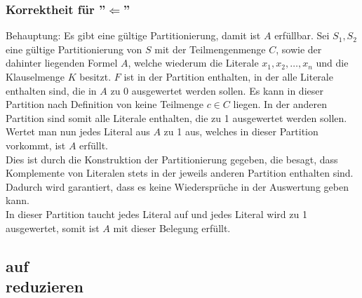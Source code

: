 \documentclass[a4paper]{article}
\begin{document}
			\subsubsection{Korrektheit für ''$\Leftarrow$''}
			Behauptung: Es gibt eine gültige Partitionierung, damit ist $A$ erfüllbar.\n
			Sei $S_1, S_2$ eine gültige Partitionierung von $S$ mit der Teilmengenmenge $C$, sowie der dahinter liegenden Formel $A$, welche wiederum die Literale $x_1, x_2, \dots, x_n$ und die Klauselmenge $K$ besitzt.
			$F$ ist in der Partition enthalten, in der alle Literale enthalten sind, die in $A$ zu 0 ausgewertet werden sollen. Es kann in dieser Partition nach Definition von \setsplit keine Teilmenge $c\in C$ liegen.
			In der anderen Partition sind somit alle Literale enthalten, die zu 1 ausgewertet werden sollen. Wertet man nun jedes Literal aus $A$ zu 1 aus, welches in dieser Partition vorkommt, ist $A$ erfüllt.\\
			Dies ist durch die Konstruktion der Partitionierung gegeben, die besagt, dass Komplemente von Literalen stets in der jeweils anderen Partition enthalten sind.
			Dadurch wird garantiert, dass es keine Wiedersprüche in der Auswertung geben kann.\\
			In dieser Partition taucht jedes Literal auf und jedes Literal wird zu 1 ausgewertet, somit ist $A$ mit dieser Belegung erfüllt.
		\subsection{}
		\subsection{\subsetsum auf \numberpartition \\ reduzieren}
\end{document}
